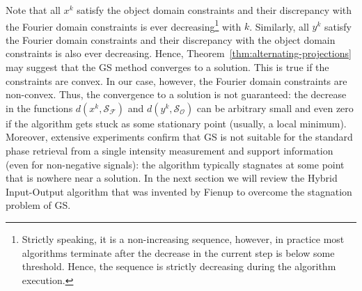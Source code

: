 Note that all $x^{k}$ satisfy the object domain constraints and their
discrepancy with the Fourier domain constraints is ever
decreasing\footnote{Strictly speaking, it is a non-increasing
  sequence, however, in practice most algorithms terminate after the
  decrease in the current step is below some threshold. Hence, the
  sequence is strictly decreasing during the algorithm execution.}
with $k$. Similarly, all $y^{k}$ satisfy the Fourier domain
constraints and their discrepancy with the object domain constraints
is also ever decreasing. Hence,
Theorem~\ref{thm:alternating-projections} may suggest that the GS
method converges to a solution. This is true if the constraints are
convex. In our case, however, the Fourier domain constraints are
non-convex. Thus, the convergence to a solution is not guaranteed: the
decrease in the functions $d(x^{k}, \mathcal{S}_{\mathcal{F}})$ and
$d(y^{k}, \mathcal{S}_{\mathcal{O}})$ can be arbitrary small and even
zero if the algorithm gets stuck as some stationary point (usually, a
local minimum). Moreover, extensive experiments confirm that GS is not
suitable for the standard phase retrieval from a single intensity
measurement and support information (even for non-negative signals):
the algorithm typically stagnates at some point that is nowhere near
a solution.  In the next section we will review the Hybrid
Input-Output algorithm that was invented by Fienup to overcome the
stagnation problem of GS.

